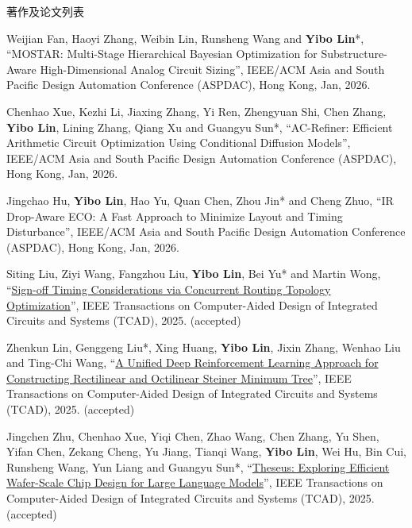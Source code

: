 \begin{rSection}{著作及论文列表}
\begin{description}[font=\normalfont, rightmargin=2em]
{}
            

\item[{[C207]}]{
        Weijian Fan, Haoyi Zhang, Weibin Lin, Runsheng Wang and \textbf{Yibo Lin}*, 
    ``MOSTAR: Multi-Stage Hierarchical Bayesian Optimization for Substructure-Aware High-Dimensional Analog Circuit Sizing'', 
    IEEE/ACM Asia and South Pacific Design Automation Conference (ASPDAC), Hong Kong, Jan, 2026.
    
}
            

\item[{[C206]}]{
        Chenhao Xue, Kezhi Li, Jiaxing Zhang, Yi Ren, Zhengyuan Shi, Chen Zhang, \textbf{Yibo Lin}, Lining Zhang, Qiang Xu and Guangyu Sun*, 
    ``AC-Refiner: Efficient Arithmetic Circuit Optimization Using Conditional Diffusion Models'', 
    IEEE/ACM Asia and South Pacific Design Automation Conference (ASPDAC), Hong Kong, Jan, 2026.
    
}
            

\item[{[C205]}]{
        Jingchao Hu, \textbf{Yibo Lin}, Hao Yu, Quan Chen, Zhou Jin* and Cheng Zhuo, 
    ``IR Drop-Aware ECO: A Fast Approach to Minimize Layout and Timing Disturbance'', 
    IEEE/ACM Asia and South Pacific Design Automation Conference (ASPDAC), Hong Kong, Jan, 2026.
    
}
            

\item[{[J204]}]{
        Siting Liu, Ziyi Wang, Fangzhou Liu, \textbf{Yibo Lin}, Bei Yu* and Martin Wong, 
    ``\href{https://doi.org/10.1109/TCAD.2024.3506216}{Sign-off Timing Considerations via Concurrent Routing Topology Optimization}'', 
    IEEE Transactions on Computer-Aided Design of Integrated Circuits and Systems (TCAD), 2025.
    (accepted)
}
            

\item[{[J203]}]{
        Zhenkun Lin, Genggeng Liu*, Xing Huang, \textbf{Yibo Lin}, Jixin Zhang, Wenhao Liu and Ting-Chi Wang, 
    ``\href{https://doi.org/10.1109/TCAD.2024.3523429}{A Unified Deep Reinforcement Learning Approach for Constructing Rectilinear and Octilinear Steiner Minimum Tree}'', 
    IEEE Transactions on Computer-Aided Design of Integrated Circuits and Systems (TCAD), 2025.
    (accepted)
}
            

\item[{[J202]}]{
        Jingchen Zhu, Chenhao Xue, Yiqi Chen, Zhao Wang, Chen Zhang, Yu Shen, Yifan Chen, Zekang Cheng, Yu Jiang, Tianqi Wang, \textbf{Yibo Lin}, Wei Hu, Bin Cui, Runsheng Wang, Yun Liang and Guangyu Sun*, 
    ``\href{https://doi.org/10.1109/TCAD.2025.3566297}{Theseus: Exploring Efficient Wafer-Scale Chip Design for Large Language Models}'', 
    IEEE Transactions on Computer-Aided Design of Integrated Circuits and Systems (TCAD), 2025.
    (accepted)
}
            


\end{description}
\end{rSection}
